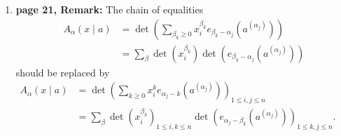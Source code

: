 \documentclass[numbers=enddot,12pt,final,onecolumn,notitlepage]{scrartcl}%
\theoremstyle{definition}
\newenvironment{proof}[1][Proof]{\noindent\textbf{#1.} }{\ \rule{0.5em}{0.5em}}
\let\sumnonlimits\sum
\renewcommand{\sum}{\sumnonlimits\limits}
\begin{document}
\begin{enumerate}
\begin{proof}
Hence, our above computation of $\det B$ can be continued as follows:%
\begin{align*}
\det B  &  =\sum_{\lambda\subseteq\left(  m^{n}\right)  }\underbrace{\left(
-1\right)  ^{\sum P+\sum Q_{\lambda}^{\left(  n,m\right)  }}}%
_{\substack{=\left(  -1\right)  ^{\left\vert \widehat{\lambda}\right\vert
}\\\text{(by (\ref{p20.claim.pf.l4}))}}}\underbrace{\det\left(
\operatorname*{sub}\nolimits_{P}^{Q_{\lambda}^{\left(  n,m\right)  }}B\right)
}_{\substack{=A_{\lambda+\delta_{n}}\left(  x\mid a\right)  \\\text{(by
(\ref{p20.claim.pf.l2}))}}}\underbrace{\det\left(  \operatorname*{sub}%
\nolimits_{\widetilde{P}}^{\widetilde{Q_{\lambda}^{\left(  n,m\right)  }}%
}B\right)  }_{\substack{=A_{\widehat{\lambda}^{\prime}+\delta_{m}}\left(
y\mid a\right)  \\\text{(by (\ref{p20.claim.pf.l3}))}}}\\
&  =\sum_{\lambda\subseteq\left(  m^{n}\right)  }\left(  -1\right)
^{\left\vert \widehat{\lambda}\right\vert }A_{\lambda+\delta_{n}}\left(  x\mid
a\right)  A_{\widehat{\lambda}^{\prime}+\delta_{m}}\left(  y\mid a\right)  .
\end{align*}
In view of (\ref{p20.claim.pf.1}), we can rewrite this as%
\[
A_{\delta_{m+n}}\left(  x,y\mid a\right)  =\sum_{\lambda\subseteq\left(
m^{n}\right)  }\left(  -1\right)  ^{\left\vert \widehat{\lambda}\right\vert
}A_{\lambda+\delta_{n}}\left(  x\mid a\right)  A_{\widehat{\lambda}^{\prime
}+\delta_{m}}\left(  y\mid a\right)  .
\]
This proves (\ref{p20.claim}).
\end{proof}

\item \textbf{page 21, Remark:} The chain of equalities%
\begin{align*}
A_{\alpha}\left(  x\mid a\right)   &  =\det\left(  \sum_{\beta_{k}\geq0}%
x_{i}^{\beta_{k}}e_{\beta_{k}-\alpha_{j}}\left(  a^{\left(  \alpha_{j}\right)
}\right)  \right) \\
&  =\sum_{\beta}\det\left(  x_{i}^{\beta_{k}}\right)  \det\left(  e_{\beta
_{k}-\alpha_{j}}\left(  a^{\left(  \alpha_{j}\right)  }\right)  \right)
\end{align*}
should be replaced by%
\begin{align}
A_{\alpha}\left(  x\mid a\right)   &  =\det\left(  \sum_{k\geq0}x_{i}%
^{k}e_{\alpha_{j}-k}\left(  a^{\left(  \alpha_{j}\right)  }\right)  \right)
_{1\leq i,j\leq n}\nonumber\\
&  =\sum_{\beta}\det\left(  x_{i}^{\beta_{k}}\right)  _{1\leq i,k\leq n}%
\det\left(  e_{\alpha_{j}-\beta_{k}}\left(  a^{\left(  \alpha_{j}\right)
}\right)  \right)  _{1\leq k,j\leq n}.\ \ \ \ \ \ \ \ \ \ \label{p20.eq2}%
\end{align}



\end{enumerate}
\end{document}
